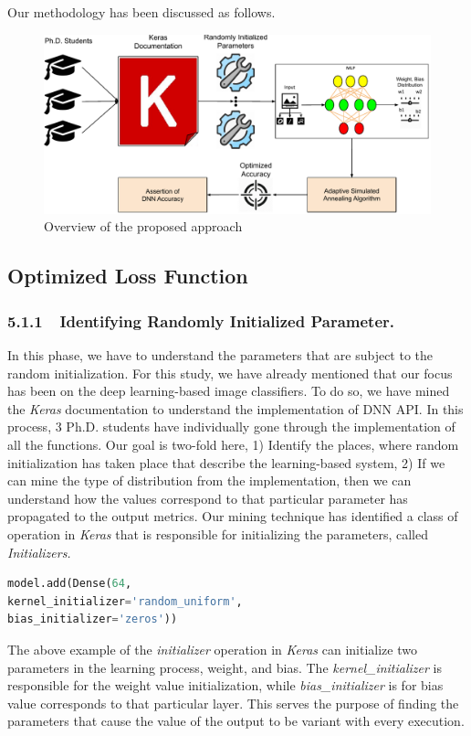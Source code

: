 Our methodology has been discussed as follows.
\begin{figure}
	\includegraphics[width=0.85\linewidth]{approach}
	\centering
	\caption{Overview of the proposed approach}
	\label{fig:flow}
	\vspace{15pt}
\end{figure}
\subsection{Optimized Loss Function}
\subsubsection{5.1.1~~Identifying Randomly Initialized Parameter.}

In this phase, we have to understand the parameters that are subject to the random initialization. For this study, we have already mentioned that our focus has been on the deep learning-based image classifiers. To do so, we have mined the \emph{Keras} \cite{chollet2015keras} documentation to understand the implementation of DNN API. In this process, 3 Ph.D. students have individually gone through the implementation of all the functions. Our goal is two-fold here, 1) Identify the places, where random initialization has taken place that describe the learning-based system, 2) If we can mine the type of distribution from the implementation, then we can understand how the values correspond to that particular parameter has propagated to the output metrics. Our mining technique has identified a class of operation in \emph{Keras} that is responsible for initializing the parameters, called \emph{Initializers.} 
\begin{lstlisting}[language=Python, caption=Example of initialization parameters in Keras]
model.add(Dense(64,
kernel_initializer='random_uniform',
bias_initializer='zeros'))
\end{lstlisting}
The above example of the \emph{initializer} operation in \emph{Keras} can initialize two parameters in the learning process, weight, and bias. The \emph{kernel\_initializer} is responsible for the weight value initialization, while \emph{bias\_initializer} is for bias value corresponds to that particular layer. This serves the purpose of finding the parameters that cause the value of the output to be variant with every execution. 

